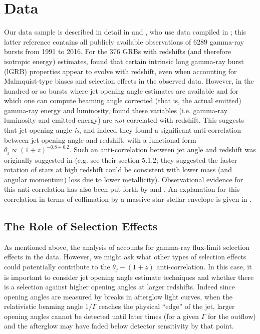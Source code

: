 \documentclass[fleqn,usenatbib,useAMS]{mnras}
\begin{document}
 \section{Data}
   Our data sample is described in detail in \cite{LR19} and \cite{LR20}, who use data compiled in \cite{Wang2019}; this latter reference contains all publicly available observations of $6289$ gamma-ray bursts from 1991 to 2016. For the 376 GRBs with redshifts (and therefore isotropic energy) estimates, \cite{LR19} found that certain intrinsic long gamma-ray burst (lGRB) properties appear to evolve with redshift, even when accounting for Malmquist-type biases and selection effects in the observed data.  However, in the hundred or so bursts where jet opening angle estimates are available and for which one can compute beaming angle corrected (that is, the actual emitted) gamma-ray energy and luminosity, \cite{LR19} found these variables (i.e. gamma-ray luminosity and emitted energy) are {\em not} correlated with redshift.  This suggests  that jet opening angle {\em is}, and indeed they found a significant anti-correlation between jet opening angle and redshift, with a functional form $\theta_{j} \propto (1+z)^{-0.8 \pm 0.2}$.  Such an anti-correlation between jet angle and redshift was originally suggested in \cite{LRFRR02} (e.g. see their section 5.1.2; they suggested the faster rotation of stars at high redshift could be consistent with lower mass (and angular momentum) loss due to lower metallicity). Observational evidence for this anti-correlation has also been put forth by \cite{Lu12} and \cite{Las14,Las18,Las18b}.  An explanation for this correlation in terms of collimation by a massive star stellar envelope is given in \cite{LR20}. 
   
   \subsection{The Role of Selection Effects}
   As mentioned above, the analysis of \cite{LR19} accounts for gamma-ray flux-limit selection effects in the data.  However, we might ask what other types of selection effects could potentially contribute to the $\theta_{j}-(1+z)$ anti-correlation.  In this case, it is important to consider jet opening angle estimate techniques and whether there is a selection against higher opening angles at larger redshifts.  Indeed since opening angles are measured by breaks in afterglow light curves, when the relativistic beaming angle $1/\Gamma$ reaches the physical ``edge'' of the jet, larger opening angles cannot be detected until later times (for a given $\Gamma$ for the outflow) and the afterglow may have faded below detector sensitivity by that point.   
   
\end{document}
